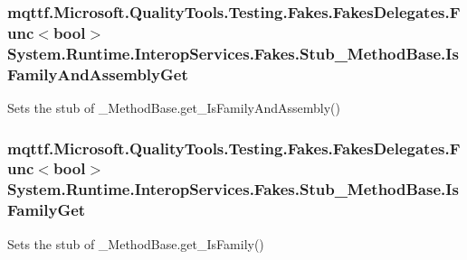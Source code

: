 \hypertarget{class_system_1_1_runtime_1_1_interop_services_1_1_fakes_1_1_stub___method_base_ade46d758283d6e55e242e39a29bfc2cb}{
\subsubsection[{Is\-Family\-And\-Assembly\-Get}]{\setlength{\rightskip}{0pt plus 5cm}mqttf.\-Microsoft.\-Quality\-Tools.\-Testing.\-Fakes.\-Fakes\-Delegates.\-Func$<$bool$>$ System.\-Runtime.\-Interop\-Services.\-Fakes.\-Stub\-\_\-\-Method\-Base.\-Is\-Family\-And\-Assembly\-Get}}\label{class_system_1_1_runtime_1_1_interop_services_1_1_fakes_1_1_stub___method_base_ade46d758283d6e55e242e39a29bfc2cb}


Sets the stub of \-\_\-\-Method\-Base.\-get\-\_\-\-Is\-Family\-And\-Assembly()

\hypertarget{class_system_1_1_runtime_1_1_interop_services_1_1_fakes_1_1_stub___method_base_a366805bfb99ef267bab7843770b6b259}{
\subsubsection[{Is\-Family\-Get}]{\setlength{\rightskip}{0pt plus 5cm}mqttf.\-Microsoft.\-Quality\-Tools.\-Testing.\-Fakes.\-Fakes\-Delegates.\-Func$<$bool$>$ System.\-Runtime.\-Interop\-Services.\-Fakes.\-Stub\-\_\-\-Method\-Base.\-Is\-Family\-Get}}\label{class_system_1_1_runtime_1_1_interop_services_1_1_fakes_1_1_stub___method_base_a366805bfb99ef267bab7843770b6b259}


Sets the stub of \-\_\-\-Method\-Base.\-get\-\_\-\-Is\-Family()

